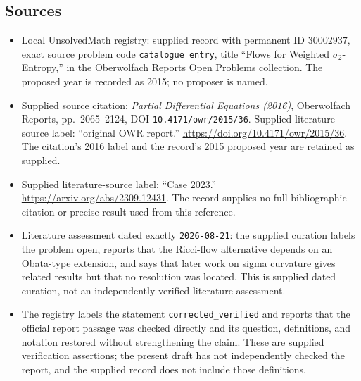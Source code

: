 \documentclass[11pt]{article}
\begin{document}
\subsection{Sources}
\begin{itemize}
\item Local UnsolvedMath registry: supplied record with permanent ID \(30002937\), exact source problem code \texttt{catalogue entry}, title ``Flows for Weighted \(\sigma_2\)-Entropy,'' in the Oberwolfach Reports Open Problems collection. The proposed year is recorded as 2015; no proposer is named.
\item Supplied source citation: \emph{Partial Differential Equations (2016)}, Oberwolfach Reports, pp.~2065--2124, DOI \texttt{10.4171/owr/2015/36}. Supplied literature-source label: ``original OWR report.'' \url{https://doi.org/10.4171/owr/2015/36}. The citation's 2016 label and the record's 2015 proposed year are retained as supplied.
\item Supplied literature-source label: ``Case 2023.'' \url{https://arxiv.org/abs/2309.12431}. The record supplies no full bibliographic citation or precise result used from this reference.
\item Literature assessment dated exactly \texttt{2026-08-21}: the supplied curation labels the problem open, reports that the Ricci-flow alternative depends on an Obata-type extension, and says that later work on sigma curvature gives related results but that no resolution was located. This is supplied dated curation, not an independently verified literature assessment.
\item The registry labels the statement \texttt{corrected\_verified} and reports that the official report passage was checked directly and its question, definitions, and notation restored without strengthening the claim. These are supplied verification assertions; the present draft has not independently checked the report, and the supplied record does not include those definitions.
\end{itemize}
\end{document}

